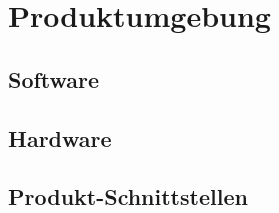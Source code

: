\section{Produktumgebung}

\subsection{Software}

\subsection{Hardware}

\subsection{Produkt-Schnittstellen}